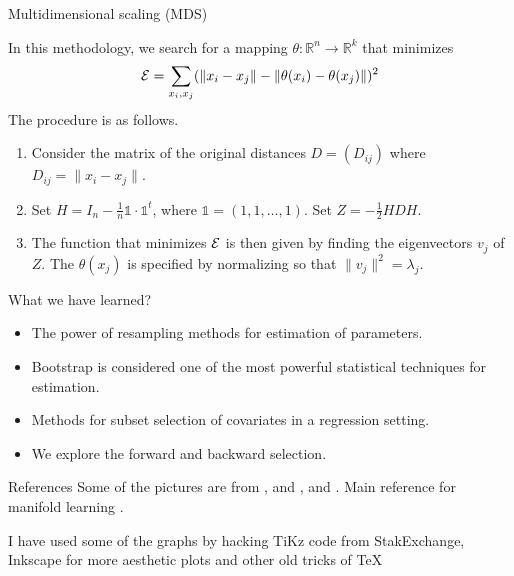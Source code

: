 \documentclass{beamer}
\begin{document}
\begin{frame}{Multidimensional scaling (MDS)}

In this methodology, we search for a mapping $\theta \colon \mathbb{R}^n \to \mathbb{R}^k$ that minimizes
\begin{equation*}
	{\cal E}= \sum_{x_i,x_j} ( \|x_i -x_j \| - \|\theta(x_i)-\theta(x_j)\|)^2
\end{equation*}
The procedure is as follows. 
\begin{enumerate}
	\item Consider the matrix of the original distances $D=(D_{ij})$ where $D_{ij}= \|x_i -x_j\|$. 
	\item Set $H= I_n - \frac{1}{n} \mathbb{1} \cdot \mathbb{1}^t$, where $\mathbb{1}= (1,1, \ldots, 1)$. Set $Z= -\frac{1}{2} H D H$.
	\item The function that minimizes $\cal E$ is then given by finding the eigenvectors $v_j$ of $Z$. The $\theta(x_j)$ is specified by normalizing so that $\|v_j\|^2=\lambda_j$.
\end{enumerate}
\end{frame}


\begin{frame}{What we have learned?	}
	\begin{itemize}
		\item The power of resampling methods for estimation of parameters.
		\item Bootstrap is considered one of the most powerful statistical techniques for estimation. 
		\item Methods for subset selection of covariates in a regression setting.
		\item We explore the forward and backward selection.
	\end{itemize}
\end{frame}



\begin{frame}{References}
	Some of the pictures are from \citep{docarmoriemann}, and \citep{schutz}, and \citep{geron2}. Main reference for manifold learning \citep{rabadan}.
	\printbibliography 	
	
	I have used some of the graphs by hacking TiKz code from StakExchange, Inkscape for more aesthetic plots and other old tricks of \TeX
	
\end{frame}


	
\end{document}
